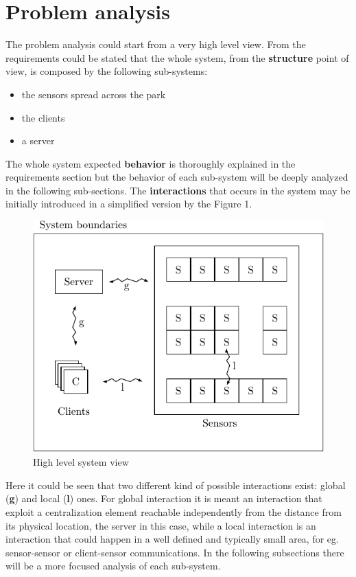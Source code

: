 \documentclass[11pt]{article}
\begin{document}
\section{Problem analysis}
The problem analysis could start from a very high level view. From the requirements could be stated that the whole system, from the \textbf{structure} point of view, is composed by the following sub-systems:
\begin{itemize}
\item the sensors spread across the park
\item the clients
\item a server
\end{itemize}
The whole system expected \textbf{behavior} is thoroughly explained in the requirements section but the behavior of each sub-system will be deeply analyzed in the following sub-sections. The \textbf{interactions} that occurs in the system may be initially introduced in a simplified version by the Figure 1.
\begin{figure}
  \centering
	\includegraphics[scale=1]{system}
  \caption{High level system view}
\end{figure}
Here it could be seen that two different kind of possible interactions exist: global (\textbf{g}) and local (\textbf{l}) ones. For global interaction it is meant an interaction that exploit a centralization element reachable independently from the distance from its physical location, the server in this case, while a local interaction is an interaction that could happen in a well defined and typically small area, for eg. sensor-sensor or client-sensor communications.
In the following subsections there will be a more focused analysis of each sub-system.
\end{document}
